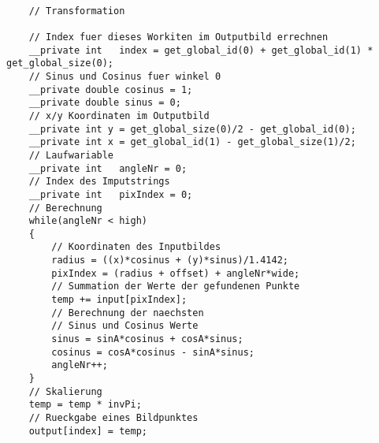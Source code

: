 \begin{lstlisting}

	// Transformation
	
	// Index fuer dieses Workiten im Outputbild errechnen
	__private int	index = get_global_id(0) + get_global_id(1) * get_global_size(0);	
	// Sinus und Cosinus fuer winkel 0
	__private double cosinus = 1;
	__private double sinus = 0;
	// x/y Koordinaten im Outputbild
	__private int y = get_global_size(0)/2 - get_global_id(0);
	__private int x = get_global_id(1) - get_global_size(1)/2;
	// Laufwariable	
	__private int	angleNr = 0;
	// Index des Imputstrings
	__private int	pixIndex = 0;
	// Berechnung
	while(angleNr < high)
	{
		// Koordinaten des Inputbildes		
		radius = ((x)*cosinus + (y)*sinus)/1.4142;
		pixIndex = (radius + offset) + angleNr*wide;
		// Summation der Werte der gefundenen Punkte
		temp += input[pixIndex];
		// Berechnung der naechsten 
		// Sinus und Cosinus Werte
		sinus = sinA*cosinus + cosA*sinus;
		cosinus = cosA*cosinus - sinA*sinus;
		angleNr++;
	}
	// Skalierung
	temp = temp * invPi;
	// Rueckgabe eines Bildpunktes
	output[index] = temp;

\end{lstlisting}

